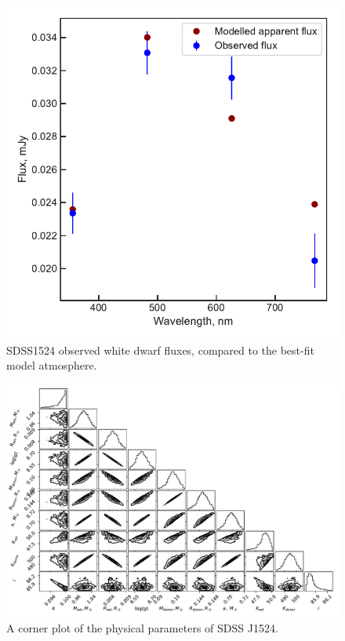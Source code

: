 \begin{figure}
    \centering
    \includegraphics[width=\textwidth]{figures/results/SDSS1524/fluxplot.pdf}
    \caption{SDSS1524 observed white dwarf fluxes, compared to the best-fit model atmosphere.}
    \label{fig:SDSS1524 flux plot}
\end{figure}
\begin{figure}
    \includegraphics[height=\textwidth, angle=90]{figures/results/physicalparams_corners/SDSS1524_physcorner.pdf}
    \caption{A corner plot of the physical parameters of SDSS J1524.}
\end{figure}
\clearpage






